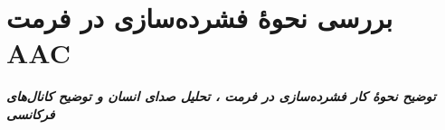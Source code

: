 \chapter{بررسی نحوهٔ فشرده‌سازی در فرمت AAC}
\noindent
\textbf{
	\textit{
        توضیح نحوهٔ کار فشرده‌سازی در فرمت ،
        تحلیل صدای انسان و توضیح کانال‌های فرکانسی
	}
}
\pagebreak